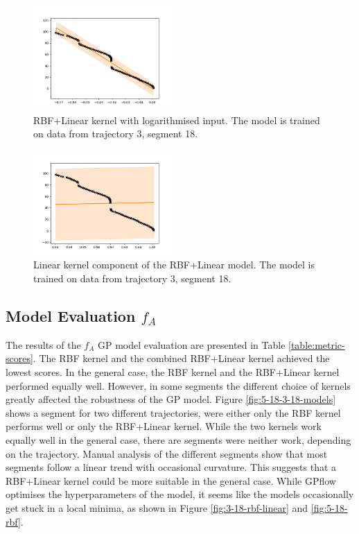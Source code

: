 \begin{figure}[t!]
    \centering
    \includegraphics[width=0.475\textwidth]{figures/forecasting/gp_3_18_rbf_linear_log}
    \caption[RBF+Linear kernel with logarithmised input.]%
    {{\small RBF+Linear kernel with logarithmised input. 
    The model is trained on data from trajectory 3, segment 18.
    }}
    \label{fig:3-18-log}
\end{figure}

\begin{figure}[t!]
    \centering
    \includegraphics[width=0.475\textwidth]{figures/forecasting/gp_3_18_linear}
    \caption[Linear kernel component of the RBF+Linear model.]%
    {{\small Linear kernel component of the RBF+Linear model. 
    The model is trained on data from trajectory 3, segment 18.
    }}
    \label{fig:3-18-linear}
\end{figure}

\subsection{Model Evaluation $f_A$}
The results of the $f_A$ GP model evaluation are presented in Table \ref{table:metric-scores}.
The RBF kernel and the combined RBF+Linear kernel achieved the lowest scores.
In the general case, the RBF kernel and the RBF+Linear kernel performed equally well.
However, in some segments the different choice of kernels greatly affected the robustness of the GP model.
Figure \ref{fig:5-18-3-18-models} shows a segment for two different trajectories, were either only the RBF kernel performs well or only the RBF+Linear kernel.
While the two kernels work equally well in the general case, there are segments were neither work, depending on the trajectory.
Manual analysis of the different segments show that most segments follow a linear trend with occasional curvature.
This suggests that a RBF+Linear kernel could be more suitable in the general case.
While GPflow optimises the hyperparameters of the model, it seems like the models occasionally get stuck in a local minima, as shown in Figure \ref{fig:3-18-rbf-linear} and \ref{fig:5-18-rbf}.

